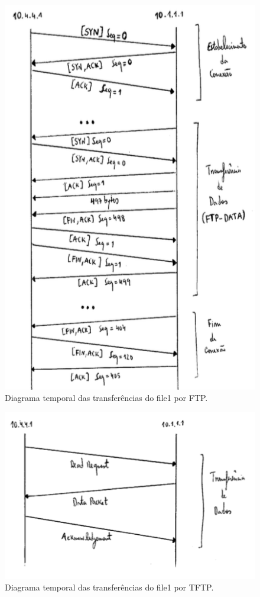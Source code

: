 \documentclass{llncs}
\begin{document}
\begin{figure}[H]
\begin{center}
\includegraphics[scale=0.45]{2_ftp.png}
\end{center}
\caption{\label{fig:ssh}Diagrama temporal das transferências do file1 por FTP.}
\end{figure}

\begin{figure}[H]
\begin{center}
\includegraphics[scale=0.45]{2_tftp.png}
\end{center}
\caption{\label{fig:ssh}Diagrama temporal das transferências do file1 por TFTP.}
\end{figure}
\end{document}
